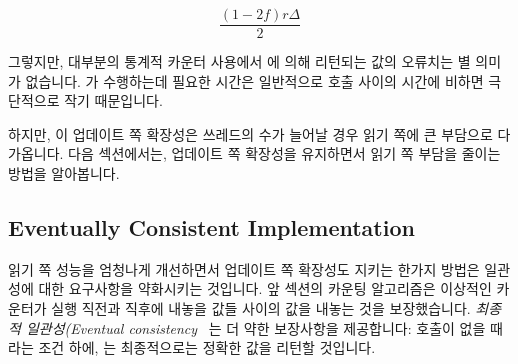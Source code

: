 {	\begin{equation}
		\frac{\left( 1 - 2 f \right) r \Delta}{2}
	\end{equation}
	\fi

	그렇지만, 대부분의 통계적 카운터 사용에서  에 의해
	리턴되는 값의 오류치는 별 의미가 없습니다.
	 가 수행하는데 필요한 시간은 일반적으로
	 호출 사이의 시간에 비하면 극단적으로 작기 때문입니다.

} \QuickQuizEnd

하지만, 이 업데이트 쪽 확장성은 쓰레드의 수가 늘어날 경우 읽기 쪽에 큰 부담으로
다가옵니다.
다음 섹션에서는, 업데이트 쪽 확장성을 유지하면서 읽기 쪽 부담을 줄이는 방법을
알아봅니다.

\subsection{Eventually Consistent Implementation}
\label{sec:count:Eventually Consistent Implementation}

읽기 쪽 성능을 엄청나게 개선하면서 업데이트 쪽 확장성도 지키는 한가지 방법은
일관성에 대한 요구사항을 약화시키는 것입니다.
앞 섹션의 카운팅 알고리즘은 이상적인 카운터가  실행 직전과
직후에 내놓을 값들 사이의 값을 내놓는 것을 보장했습니다.
\emph{최종적 일관성(Eventual
consistency}~\cite{WernerVogels:2009:EventuallyConsistent} 는 더 약한
보장사항을 제공합니다:  호출이 없을 때라는 조건 하에,
 는 최종적으로는 정확한 값을 리턴할 것입니다.

